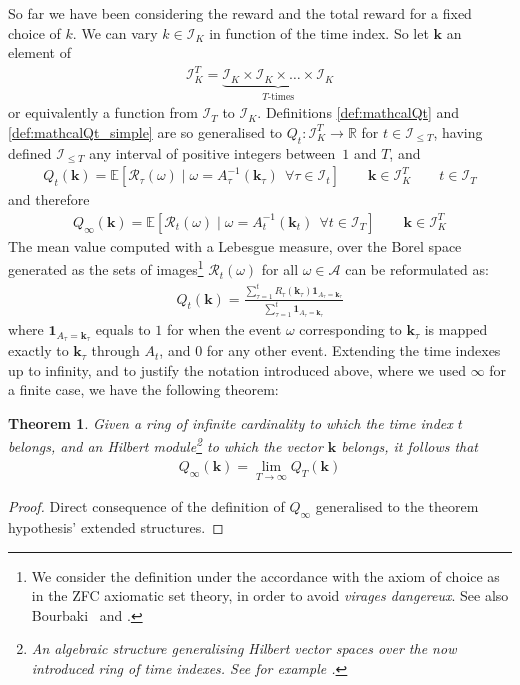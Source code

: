 \documentclass[]{scrartcl}
\newtheorem{theorem}{Theorem}[section]
\theoremstyle{definition}
\begin{document}
So far we have been considering the reward and the total reward for a fixed choice of $k$. We can vary $k\in \mathcal{I}_K$ in function of the time index. So let $\mathbf{k}$ an element of
\begin{align*}
\mathcal{I}_K^T = \underbrace{\mathcal{I}_K\times \mathcal{I}_K \times \dots \times \mathcal{I}_K}_{T\text{-times}}
\end{align*}
or equivalently a function from $\mathcal{I}_T$ to $\mathcal{I}_K$.
Definitions \ref{def:mathcalQt} and \ref{def:mathcalQt_simple} are so generalised to $Q_t:\mathcal{I}_K^T \rightarrow \mathbb{R}$ for $t\in\mathcal{I}_{\leq T}$, having defined $\mathcal{I}_{\leq T}$ any interval of positive integers between~$1$ and $T$, and
\begin{align*}
Q_t(\mathbf{k}) = \mathbb{E} \left[ \mathcal{R}_{\tau}(\omega)
\mid
\omega = A^{-1}_{\tau}(\mathbf{k}_{\tau})~~ \forall \tau \in \mathcal{I}_t \right]
\qquad
\mathbf{k} \in \mathcal{I}_K^T
\qquad
t \in \mathcal{I}_T
\end{align*}
and therefore
\begin{align*}
Q_{\infty}(\mathbf{k}) = \mathbb{E} \left[ \mathcal{R}_{t}(\omega)
\mid
\omega = A^{-1}_{t}(\mathbf{k}_{t})~~ \forall t \in \mathcal{I}_T \right]
\qquad
\mathbf{k} \in \mathcal{I}_K^T
\end{align*}
The mean value computed with a Lebesgue measure, over the Borel space generated as the sets of images\footnote{
    We consider the definition under the accordance with the axiom of choice as in the ZFC axiomatic set theory, in order to avoid \emph{virages dangereux}. See also Bourbaki~\cite{bourbaki2004theory} and \cite{takeuti1982classes}.
} $\mathcal{R}_t(\omega)$ for all $\omega \in \mathcal{A}$ can be reformulated as:
\begin{align*}
Q_t(\mathbf{k})
=
\frac
{\sum_{\tau=1}^{t} R_{\tau}(\mathbf{k}_{\tau}) \mathbf{1}_{A_\tau = \mathbf{k}_{\tau}}}
{\sum_{\tau=1}^{t} \mathbf{1}_{A_\tau = \mathbf{k}_{\tau}}}
\end{align*}
where $\mathbf{1}_{A_\tau = \mathbf{k}_{\tau}}$ equals to $1$ for when the event $\omega$ corresponding to $\mathbf{k}_{\tau}$ is mapped exactly to $\mathbf{k}_{\tau}$ through $A_t$, and $0$ for any other event.
Extending the time indexes up to infinity, and to justify the notation introduced above, where we used $\infty$ for a finite case, we have the following theorem:
\begin{theorem}\label{th:bourbaki}
Given a ring of infinite cardinality to which the time index $t$ belongs, and an Hilbert module\footnote{An algebraic structure generalising Hilbert vector spaces over the now introduced ring of time indexes. See for example \cite{bourbaki1987topological}.} to which the vector $\mathbf{k}$ belongs, it follows that
\begin{align*}
Q_{\infty}(\mathbf{k}) = \lim_{T \rightarrow \infty} Q_{T}(\mathbf{k})
\end{align*}
\end{theorem}
\begin{proof}
    Direct consequence of the definition of $Q_{\infty}$ generalised to the theorem hypothesis' extended structures.
\end{proof}
\end{document}
